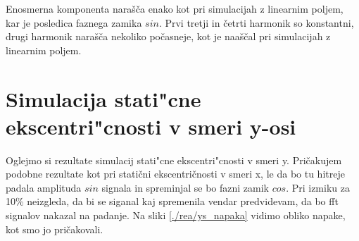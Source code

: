 Enosmerna komponenta narašča enako kot pri simulacijah z linearnim poljem, kar je posledica faznega zamika $sin$. 
Prvi tretji in četrti harmonik so konstantni, drugi harmonik narašča nekoliko počasneje, kot je naaščal pri simulacijah z linearnim poljem. 


%
%
%


\section{Simulacija stati"cne ekscentri"cnosti v smeri y-osi}

Oglejmo si rezultate simulacij stati"cne ekscentri"cnosti v smeri y. Pričakujem podobne rezultate kot pri statični ekscentričnosti v smeri x, le da bo tu hitreje padala amplituda $sin$ signala in spreminjal se bo fazni zamik $cos$. Pri izmiku za 10\% neizgleda, da bi se siganal kaj spremenila vendar predvidevam, da bo fft signalov nakazal na padanje. Na sliki \ref{./rea/ys_napaka} vidimo obliko napake, kot smo jo pričakovali.

